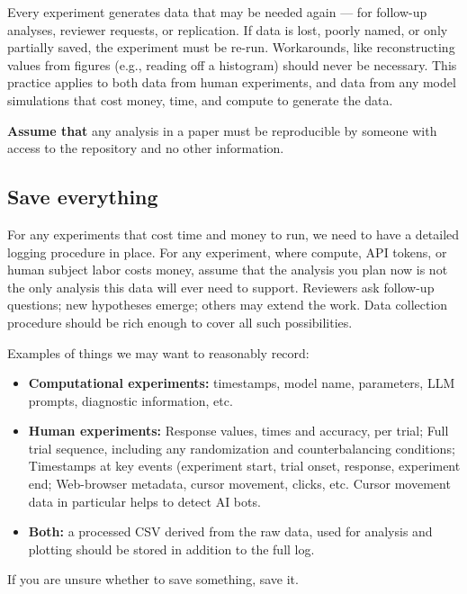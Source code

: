 \documentclass[11pt, letterpaper]{article}
\begin{document}
Every experiment generates data that may be needed again --- for follow-up analyses,
reviewer requests, or replication. If data is lost, poorly named, or only partially
saved, the experiment must be re-run. Workarounds, like reconstructing values from figures (e.g., reading off a histogram) should never be necessary. This practice applies to both data from human experiments, and data from any model simulations that cost money, time, and compute to generate the data. 

\textbf{Assume that} any analysis in a paper must be reproducible by someone with
access to the repository and no other information.

\subsection{Save everything}

For any experiments that cost time and money to run, we need to have a detailed logging procedure in place. 
For any experiment, where compute, API tokens, or human subject labor costs money, assume that the analysis you plan now is not the only analysis this data will ever need to support. Reviewers ask follow-up questions; new hypotheses emerge; others may extend the work. Data collection procedure should be rich enough to cover all such possibilities.

Examples of things we may want to reasonably record:

\begin{itemize}[itemsep=0.2em]
  \item \textbf{Computational experiments:} timestamps, model name, parameters, LLM prompts, diagnostic information, etc.
  \item \textbf{Human experiments:} Response values, times and accuracy, per trial; Full trial sequence, including any randomization and counterbalancing conditions; Timestamps at key events (experiment start, trial onset, response,
    experiment end; Web-browser metadata, cursor movement, clicks, etc. Cursor movement data in particular helps to detect AI bots.
  \item \textbf{Both:} a processed CSV derived from the raw data, used for
    analysis and plotting should be stored in addition to the full log.
\end{itemize}

If you are unsure whether to save something, save it.
\end{document}

